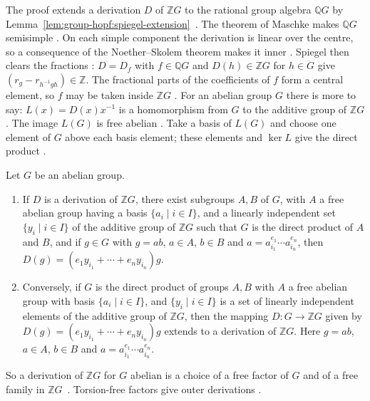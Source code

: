 The proof extends a derivation $D$ of $\mathbb{Z}G$ to the rational group
algebra $\mathbb{Q}G$ by Lemma~\ref{lem:group-hopf:spiegel-extension}~\cite[p.~2958]{Spiegel1994}. The
theorem of Maschke makes $\mathbb{Q}G$ semisimple \cite[p.~2956]{Spiegel1994}.
On each simple component the derivation is linear over the centre, so a
consequence of the Noether--Skolem theorem makes it inner
\cite[pp.~2956--2957]{Spiegel1994}. Spiegel then clears the fractions
\cite[pp.~2957--2958]{Spiegel1994}: $D= D_f$ with $f\in\mathbb{Q}G$ and
$D(h)\in\mathbb{Z}G$ for $h\in G$ give $(r_g-r_{h^{-1}gh})\in\mathbb{Z}$. The
fractional parts of the coefficients of $f$ form a central element, so $f$ may
be taken inside $\mathbb{Z}G$ \cite[pp.~2957--2958]{Spiegel1994}. For an
abelian group $G$ there is more to say: $L(x)=D(x)x^{-1}$ is a homomorphism
from $G$ to the additive group of $\mathbb{Z}G$ \cite[p.~2958]{Spiegel1994}.
The image $L(G)$ is free abelian \cite[p.~2958]{Spiegel1994}. Take a basis of
$L(G)$ and choose one element of $G$ above each basis element; these elements
and $\ker L$ give the direct product \cite[p.~2958]{Spiegel1994}.

\begin{theorem}\label{thm:group-hopf:spiegel-abelian}
Let $G$ be an abelian group.
\begin{enumerate}
\item If $D$ is a derivation of $\mathbb{Z}G$, there exist subgroups $A,B$ of $G$,
with $A$ a free abelian group having a basis $\{a_i\mid i\in I\}$, and a linearly
independent set $\{y_i\mid i\in I\}$ of the additive group of $\mathbb{Z}G$ such
that $G$ is the direct product of $A$ and $B$, and if $g\in G$ with $g=ab$, $a\in A$,
$b\in B$ and $a=a_{i_1}^{e_1}\cdots a_{i_n}^{e_n}$, then
$D(g)=(e_1 y_{i_1}+\cdots+e_n y_{i_n})g$.
\item Conversely, if $G$ is the direct product of groups $A,B$ with $A$ a free
abelian group with basis $\{a_i\mid i\in I\}$, and $\{y_i\mid i\in I\}$ is a set of
linearly independent elements of the additive group of $\mathbb{Z}G$, then the
mapping $D\colon G\to\mathbb{Z}G$ given by
$D(g)=(e_1 y_{i_1}+\cdots+e_n y_{i_n})g$ extends to a derivation of $\mathbb{Z}G$.
Here $g=ab$, $a\in A$, $b\in B$ and $a=a_{i_1}^{e_1}\cdots a_{i_n}^{e_n}$.
\end{enumerate}
\end{theorem}

So a derivation of $\mathbb{Z}G$ for $G$ abelian is a choice of a free factor
of $G$ and of a free family in $\mathbb{Z}G$~\cite[Theorem~2, p.~2959--2959]{Spiegel1994}. Torsion-free factors give outer
derivations \cite[Theorem~2, p.~2959--2959]{Spiegel1994}.

